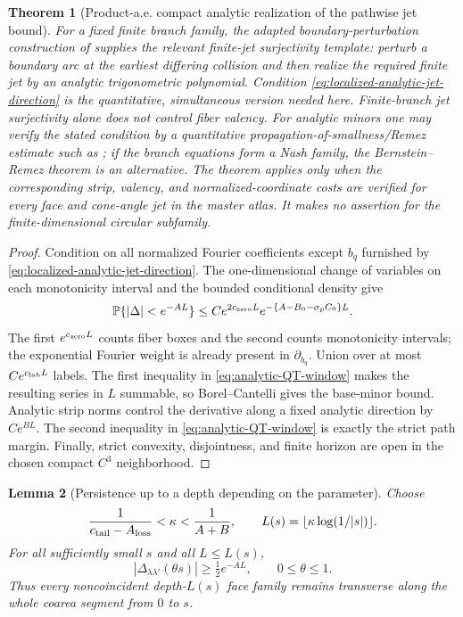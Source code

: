 \documentclass[11pt]{article}
\newtheorem{theorem}{Theorem}[section]
\newtheorem{lemma}[theorem]{Lemma}
\begin{document}
\begin{theorem}[Product-a.e. compact analytic realization of the pathwise jet bound]
For a fixed finite branch family, the adapted boundary-perturbation
construction of \cite{BFLS2026} supplies the relevant finite-jet
surjectivity template: perturb a boundary arc at the earliest differing
collision and then realize the required finite jet by an analytic
trigonometric polynomial.  Condition
\eqref{eq:localized-analytic-jet-direction} is the quantitative, simultaneous
version needed here.  Finite-branch jet surjectivity alone does not control
fiber valency.  For analytic minors one may verify the stated condition by a
quantitative propagation-of-smallness/Remez estimate such as
\cite{HWWRemez}; if the branch equations form a Nash family, the
Bernstein--Remez theorem \cite{BarbieriNash} is an alternative.  The theorem
applies only when the corresponding strip, valency, and normalized-coordinate
costs are verified for every face and cone-angle jet in the master atlas.  It
makes no assertion for the finite-dimensional circular subfamily.
\end{theorem}

\begin{proof}
Condition on all normalized Fourier coefficients except $b_q$ furnished
by \eqref{eq:localized-analytic-jet-direction}.  The one-dimensional change
of variables on each monotonicity interval and the bounded conditional density
give
\[
 \mathbb P\{|\Delta|<e^{-AL}\}
 \le C e^{2c_{\rm zero}L}
 e^{-\{A-B_0-\sigma_pC_0\}L}.
\]
The first $e^{c_{\rm zero}L}$ counts fiber boxes and the second counts
monotonicity intervals; the exponential Fourier weight is already present in
$\partial_{b_q}$.  Union over at most $Ce^{c_{\rm lab}L}$ labels.  The first inequality
in \eqref{eq:analytic-QT-window} makes the resulting series in $L$
summable, so Borel--Cantelli gives the base-minor bound.  Analytic strip norms
control the derivative along a fixed analytic direction by $Ce^{BL}$.
The second inequality in \eqref{eq:analytic-QT-window} is exactly the strict
path margin.  Finally, strict convexity, disjointness, and finite horizon are
open in the chosen compact $C^3$ neighborhood.
\end{proof}

\begin{lemma}[Persistence up to a depth depending on the parameter]
\label{lem:finite-depth-face-separation}
Choose
\begin{equation}
\label{eq:kappa-path-window}
 \frac1{c_{\rm tail}-A_{\rm loss}}<\kappa<\frac1{A+B},
 \qquad L(s)=\lfloor\kappa\log(1/|s|)\rfloor.
\end{equation}
For all sufficiently small $s$ and all $L\le L(s)$,
\[
 |\Delta_{\lambda\lambda'}(\theta s)|\ge\tfrac12e^{-AL},
 \qquad 0\le\theta\le1.
\]
Thus every noncoincident depth-$L(s)$ face family remains transverse along the
whole coarea segment from $0$ to $s$.
\end{lemma}
\end{document}
